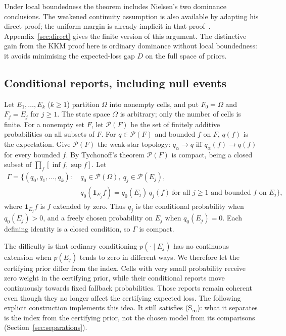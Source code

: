 \documentclass[11pt]{article}
\theoremstyle{definition}
\theoremstyle{remark}
\newcommand{\PP}{\mathcal P}
\newcommand{\one}{\mathbf 1}
\begin{document}
Under local boundedness the theorem includes Nielsen's two dominance conclusions. The weakened continuity assumption is also available by adapting his direct proof; the uniform margin is already implicit in that proof~\cite[Appendix~C, (9)]{Nielsen}. Appendix~\ref{sec:direct} gives the finite version of this argument. The distinctive gain from the KKM proof here is ordinary dominance without local boundedness: it avoids minimising the expected-loss gap $D$ on the full space of priors.

\subsection{Conditional reports, including null events}\label{sec:conditional}
Let $E_1,\dots,E_k$ ($k\ge1$) partition $\Omega$ into nonempty cells, and put $F_0=\Omega$ and $F_j=E_j$ for $j\ge1$. The state space $\Omega$ is arbitrary; only the number of cells is finite. For a nonempty set $F$, let $\PP(F)$ be the set of finitely additive probabilities on all subsets of $F$. For $q\in\PP(F)$ and bounded $f$ on $F$, $q(f)$ is the expectation. Give $\PP(F)$ the weak-star topology: $q_\alpha\to q$ iff $q_\alpha(f)\to q(f)$ for every bounded $f$. By Tychonoff's theorem $\PP(F)$ is compact, being a closed subset of $\prod_f[\inf f,\sup f]$. Let
\[
\begin{aligned}
 \Gamma=\bigl\{(q_0,q_1,\dots,q_k):\ & q_0\in\PP(\Omega),\ q_j\in\PP(E_j),\\
 & q_0(\one_{E_j}f)=q_0(E_j)\,q_j(f)\ \text{for all }j\ge1\text{ and bounded }f\text{ on }E_j\bigr\},
\end{aligned}
\]
where $\one_{E_j}f$ is $f$ extended by zero. Thus $q_j$ is the conditional probability when $q_0(E_j)>0$, and a freely chosen probability on $E_j$ when $q_0(E_j)=0$. Each defining identity is a closed condition, so $\Gamma$ is compact.

The difficulty is that ordinary conditioning $p(\cdot\mid E_j)$ has no continuous extension when $p(E_j)$ tends to zero in different ways. We therefore let the certifying prior differ from the index. Cells with very small probability receive zero weight in the certifying prior, while their conditional reports move continuously towards fixed fallback probabilities. Those reports remain coherent even though they no longer affect the certifying expected loss. The following explicit construction implements this idea. It still satisfies (S$_\infty$): what it separates is the index from the certifying prior, not the chosen model from its comparisons (Section~\ref{sec:separations}).
\end{document}
